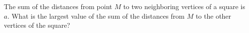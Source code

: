 The sum of the distances from point $M$ to two neighboring vertices of a square is $a$. What is the largest value of the sum of the distances from $M$ to the other vertices of the square?
